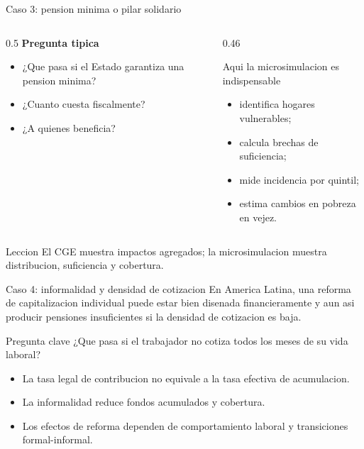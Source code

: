 \documentclass[10pt,aspectratio=169]{beamer}
\begin{document}
\begin{frame}{Caso 3: pension minima o pilar solidario}
\begin{columns}[T]
\begin{column}{0.5\textwidth}
\textbf{Pregunta tipica}
\begin{itemize}
  \item ¿Que pasa si el Estado garantiza una pension minima?
  \item ¿Cuanto cuesta fiscalmente?
  \item ¿A quienes beneficia?
\end{itemize}
\end{column}
\begin{column}{0.46\textwidth}
\begin{block}{Aqui la microsimulacion es indispensable}
\begin{itemize}
  \item identifica hogares vulnerables;
  \item calcula brechas de suficiencia;
  \item mide incidencia por quintil;
  \item estima cambios en pobreza en vejez.
\end{itemize}
\end{block}
\end{column}
\end{columns}

\vspace{0.2cm}
\begin{alertblock}{Leccion}
El CGE muestra impactos agregados; la microsimulacion muestra distribucion, suficiencia y cobertura.
\end{alertblock}
\end{frame}

\begin{frame}{Caso 4: informalidad y densidad de cotizacion}
\justifying
En America Latina, una reforma de capitalizacion individual puede estar bien disenada financieramente y aun asi producir pensiones insuficientes si la densidad de cotizacion es baja.

\vspace{0.25cm}
\begin{block}{Pregunta clave}
¿Que pasa si el trabajador no cotiza todos los meses de su vida laboral?
\end{block}

\vspace{0.2cm}
\begin{itemize}
  \item La tasa legal de contribucion no equivale a la tasa efectiva de acumulacion.
  \item La informalidad reduce fondos acumulados y cobertura.
  \item Los efectos de reforma dependen de comportamiento laboral y transiciones formal-informal.
\end{itemize}
\end{frame}
\end{document}
